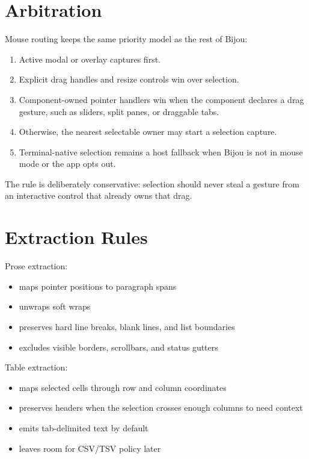 \section{Arbitration}\label{record-127-arbitration}

Mouse routing keeps the same priority model as the rest of Bijou:

\begin{enumerate}
\def\labelenumi{\arabic{enumi}.}
\tightlist
\item
  Active modal or overlay captures first.
\item
  Explicit drag handles and resize controls win over selection.
\item
  Component-owned pointer handlers win when the component declares a drag gesture, such as sliders, split panes, or draggable tabs.
\item
  Otherwise, the nearest selectable owner may start a selection capture.
\item
  Terminal-native selection remains a host fallback when Bijou is not in mouse mode or the app opts out.
\end{enumerate}

The rule is deliberately conservative: selection should never steal a gesture from an interactive control that already owns that drag.

\section{Extraction Rules}\label{record-127-extraction-rules}

Prose extraction:

\begin{itemize}
\tightlist
\item
  maps pointer positions to paragraph spans
\item
  unwraps soft wraps
\item
  preserves hard line breaks, blank lines, and list boundaries
\item
  excludes visible borders, scrollbars, and status gutters
\end{itemize}

Table extraction:

\begin{itemize}
\tightlist
\item
  maps selected cells through row and column coordinates
\item
  preserves headers when the selection crosses enough columns to need context
\item
  emits tab-delimited text by default
\item
  leaves room for CSV/TSV policy later
\end{itemize}

